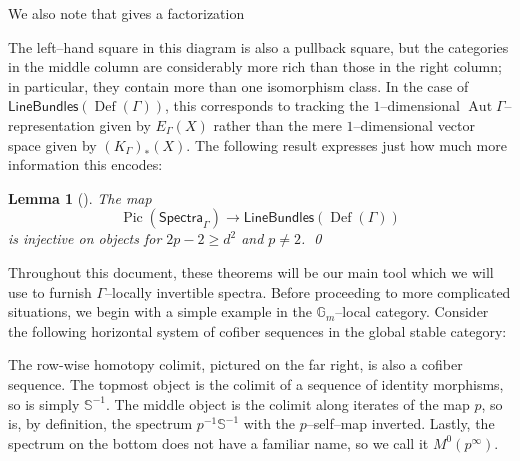 \documentclass{amsart}
\renewcommand{\S}{\mathbb S}
\newcommand{\G}{\mathbb G}
\newcommand{\<}{\langle}
\renewcommand{\>}{\rangle}
\newcommand{\CatOf}[1]{\mathsf{#1}}
\newcommand{\sheaf}[1]{\mathcal{#1}}
\DeclareMathOperator{\Aut}{Aut}
\DeclareMathOperator{\Def}{Def}
\DeclareMathOperator{\Pic}{Pic}
\theoremstyle{plain}
\newtheorem*{lemma}{Lemma}
\theoremstyle{definition}
\theoremstyle{remark}
\begin{document}
We also note that  gives a factorization
\begin{center}
\end{center}
The left--hand square in this diagram is also a pullback square, but the categories in the middle column are considerably more rich than those in the right column; in particular, they contain more than one isomorphism class.  In the case of $\CatOf{LineBundles}(\Def(\Gamma))$, this corresponds to tracking the $1$--dimensional $\Aut \Gamma$--representation given by $E_\Gamma(X)$ rather than the mere $1$--dimensional vector space given by $(K_\Gamma)_*(X)$.  The following result expresses just how much more information this encodes:

\begin{lemma}[{\cite[Proposition 7.5]{HMS}}]\label{EthyDeterminesPic}
The map \[\Pic(\CatOf{Spectra}_\Gamma) \to \CatOf{LineBundles}(\Def(\Gamma))\] is injective on objects for $2p - 2 \ge d^2$ and $p \ne 2$. \qed
\end{lemma}

Throughout this document, these theorems will be our main tool which we will use to furnish $\Gamma$--locally invertible spectra.  Before proceeding to more complicated situations, we begin with a simple example in the $\G_m$--local category.  Consider the following horizontal system of cofiber sequences in the global stable category:
\begin{center}
\end{center}
The row-wise homotopy colimit, pictured on the far right, is also a cofiber sequence.  The topmost object is the colimit of a sequence of identity morphisms, so is simply $\S^{-1}$.  The middle object is the colimit along iterates of the map $p$, so is, by definition, the spectrum $p^{-1} \S^{-1}$ with the $p$--self--map inverted.  Lastly, the spectrum on the bottom does not have a familiar name, so we call it $M^0(p^\infty)$.
\end{document}
